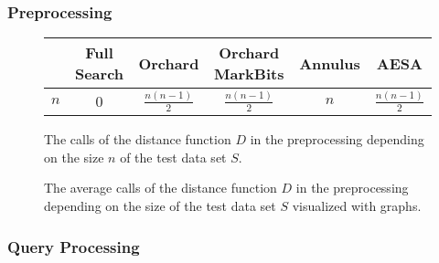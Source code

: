 \documentclass[runningheads,a4paper]{llncs}
\begin{document}
\subsubsection{Preprocessing}

\begin{figure}
	\begin{center}
		\begin{tabular}{ | l | c | c | c | c | c |}
			\hline
		  	& Full Search & Orchard & Orchard MarkBits & Annulus & AESA \\ \hline
		  	$n$ & 0 & $\frac{n(n-1)}{2}$ & $\frac{n(n-1)}{2}$ & $n$ & $\frac{n(n-1)}{2}$ \\ \hline
		\end{tabular}
	\end{center}
	\caption{The calls of the distance function $D$ in the preprocessing depending on the size $n$ of the test data set
		$S$.}
	\label{fig:preprocessing:tabular}
\end{figure}

\begin{figure}
	\begin{center}
	\end{center}
	\caption{The average calls of the distance function $D$ in the preprocessing depending on the size of the test data
		set $S$ visualized with graphs.}
	\label{fig:preprocessing:graph}
\end{figure}

\subsubsection{Query Processing}
\end{document}
